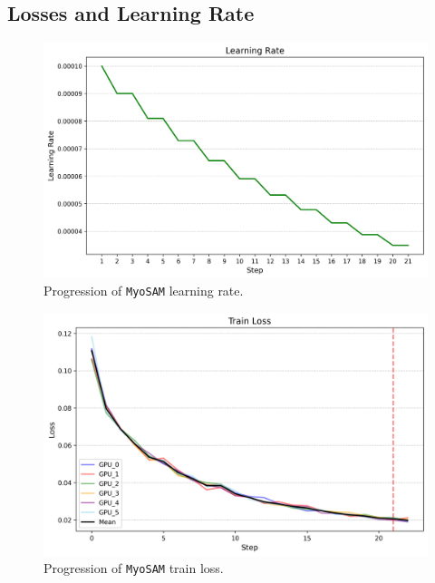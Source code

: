\subsection{Losses and Learning Rate}\label{seclr}
\begin{figure}[H]
	\centering
	\includegraphics[width=\textwidth]{"images/lr.png"}
	\caption[Learning rate \texttt{MyoSAM}]{Progression of \texttt{MyoSAM} learning rate.}
	\label{figlr}
\end{figure}
\begin{figure}[H]
	\centering
	\includegraphics[width=\textwidth]{"images/train_loss.png"}
	\caption[Train loss \texttt{MyoSAM}]{Progression of \texttt{MyoSAM} train loss.}
	\label{figtrainloss}
\end{figure}
